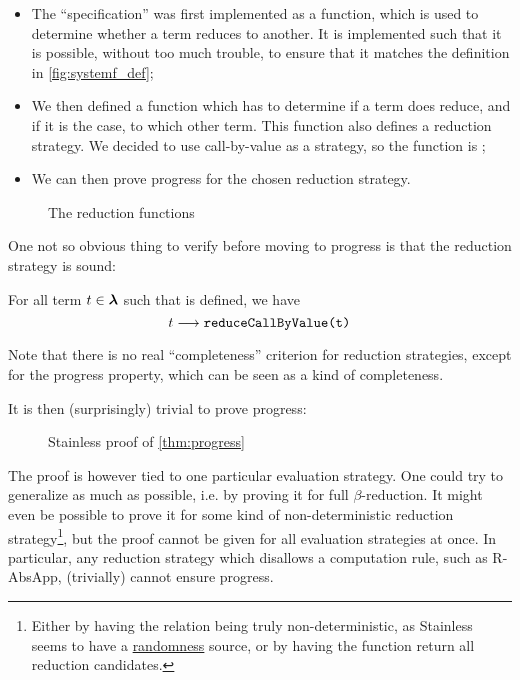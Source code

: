 \begin{itemize}
    \item The ``specification'' was first implemented as a  function, which is used to determine whether a term reduces to another. It is implemented such that it is possible, without too much trouble, to ensure that it matches the definition in \cref{fig:systemf_def};
    \item We then defined a function which has to determine if a term does reduce, and if it is the case, to which other term. This function also defines a reduction strategy. We decided to use call-by-value as a strategy, so the function is ;
    \item We can then prove progress for the chosen reduction strategy.
\end{itemize}

\begin{figure}[h]
    \centering
    
    \caption{The reduction functions}
\end{figure}

\noindent
One not so obvious thing to verify before moving to progress is that the reduction strategy is sound:
\begin{theorem}\label{thm:cbv_sound}
    For all term $t \in \bm\lambda$ such that  is defined, we have
    \[t \longrightarrow{}{} \texttt{reduceCallByValue(t)}\]
\end{theorem}

\noindent
Note that there is no real ``completeness'' criterion for reduction strategies,
except for the progress property, which can be seen as a kind of completeness.

It is then (surprisingly) trivial to prove progress:
\begin{figure}[h]
    \centering
    
    \caption{Stainless proof of \cref{thm:progress}}
\end{figure}

\noindent
The proof is however tied to one particular evaluation strategy. 
One could try to generalize as much as possible, i.e. by proving it for full $\beta$-reduction. It might even be possible to prove it for some kind of non-deterministic reduction strategy\footnote{Either by having the relation being truly non-deterministic, as Stainless seems to have a \href{https://github.com/epfl-lara/stainless/blob/160a14a5bec19b6fc386b839edbed07cdd3e70fd/frontends/library/stainless/util/Random.scala}{randomness} source, or by having the function return all reduction candidates.}, but the proof cannot be given for all evaluation strategies at once. In particular, any reduction strategy which disallows a computation rule, such as R-AbsApp, (trivially) cannot ensure progress.

